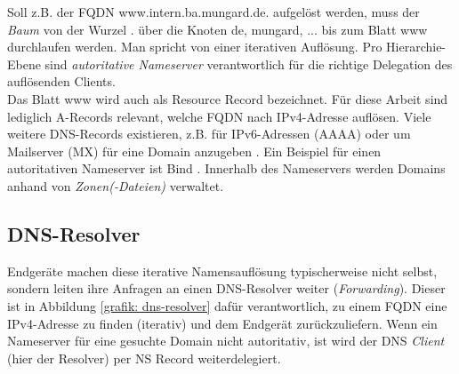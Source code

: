 Soll z.B. der FQDN www.intern.ba.mungard.de. aufgelöst werden, muss der \textit{Baum} von der Wurzel \glqq .\grqq{} über die Knoten \glqq de\grqq{}, \glqq mungard\grqq{}, ... bis zum Blatt \glqq www\grqq{} durchlaufen werden. Man spricht von einer iterativen Auflösung. Pro Hierarchie-Ebene sind \textit{autoritative Nameserver} verantwortlich für die richtige Delegation des auflösenden Clients.\\
Das Blatt \glqq www\grqq{} wird auch als Resource Record bezeichnet. Für diese Arbeit sind lediglich A-Records relevant, welche FQDN nach IPv4-Adresse auflösen. Viele weitere DNS-Records existieren, z.B. für IPv6-Adressen (AAAA) oder um Mailserver (MX) für eine Domain anzugeben \cite[S.528]{Fall2011}. Ein Beispiel für einen autoritativen Nameserver ist Bind \cite{liu2006dns}. Innerhalb des Nameservers werden Domains anhand von \textit{Zonen(-Dateien)} verwaltet.

\subsection{DNS-Resolver}
Endgeräte machen diese iterative Namensauflösung typischerweise nicht selbst, sondern leiten ihre Anfragen an einen DNS-Resolver weiter (\textit{Forwarding}). Dieser ist in Abbildung \ref{grafik: dns-resolver} dafür verantwortlich, zu einem FQDN eine IPv4-Adresse zu finden (iterativ) und dem Endgerät zurückzuliefern. Wenn ein Nameserver für eine gesuchte Domain nicht autoritativ, ist wird der DNS \textit{Client} (hier der Resolver) per NS Record weiterdelegiert.


